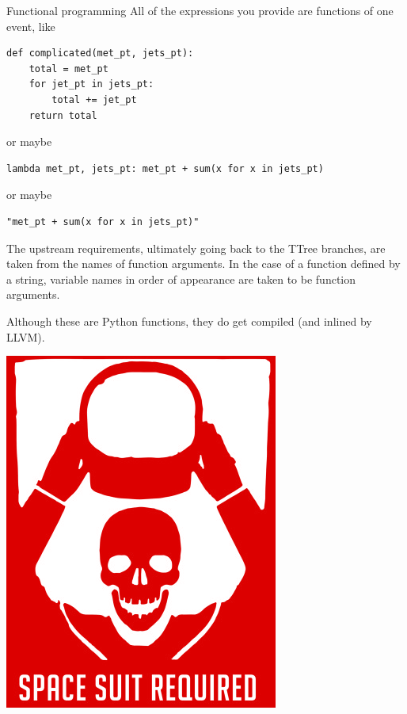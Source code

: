 \documentclass[aspectratio=169]{beamer}
\begin{document}
\begin{frame}[fragile]{Functional programming}
\vspace{0.25 cm}
\small
{\normalsize All of the expressions you provide are functions of one event, like}
\begin{verbatim}
def complicated(met_pt, jets_pt):
    total = met_pt
    for jet_pt in jets_pt:
        total += jet_pt
    return total
\end{verbatim}

\vspace{0.1 cm}
{\normalsize or maybe}

\vspace{0.1 cm}
\begin{verbatim}
lambda met_pt, jets_pt: met_pt + sum(x for x in jets_pt)
\end{verbatim}

\vspace{0.1 cm}
{\normalsize or maybe}

\vspace{0.1 cm}
\begin{verbatim}
"met_pt + sum(x for x in jets_pt)"
\end{verbatim}

\vspace{0.1 cm}
The upstream requirements, ultimately going back to the TTree branches, are taken from the names of function arguments. In the case of a function defined by a string, variable names in order of appearance are taken to be function arguments.

\vspace{0.1 cm}
Although these are Python functions, they do get compiled (and inlined by LLVM).

\vspace{-5 cm}
\hfill \includegraphics[width=1.5 cm]{danger.png}\hspace{-0.9 cm}
\vspace{5 cm}
\end{frame}
\end{document}
